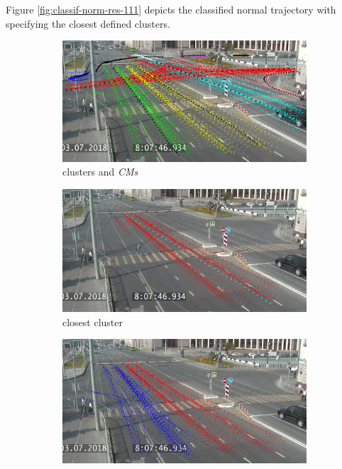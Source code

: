 Figure \ref{fig:classif-norm-res-111} depicts the classified normal trajectory with specifying the closest defined clusters.

\begin{figure}[htb!]
	\centering
	\begin{subfigure}[!htb]{0.24\textwidth}
		\centering{}
		\includegraphics[width=\textwidth]{images/classif-res/models-all-1.png}
		\caption{clusters and \textit{CMs}}
	\end{subfigure}
	\hfill
	\begin{subfigure}[!htb]{0.24\textwidth}
		\centering{}
		\includegraphics[width=\textwidth]{images/classif-res/closest-cl-1.png}
		\caption{closest cluster}
	\end{subfigure}
	\hfill
	\begin{subfigure}[!htb]{0.24\textwidth}
		\centering{}
		\includegraphics[width=\textwidth]{images/classif-res/closest-cl-two.png}

\end{subfigure}
\end{figure}

